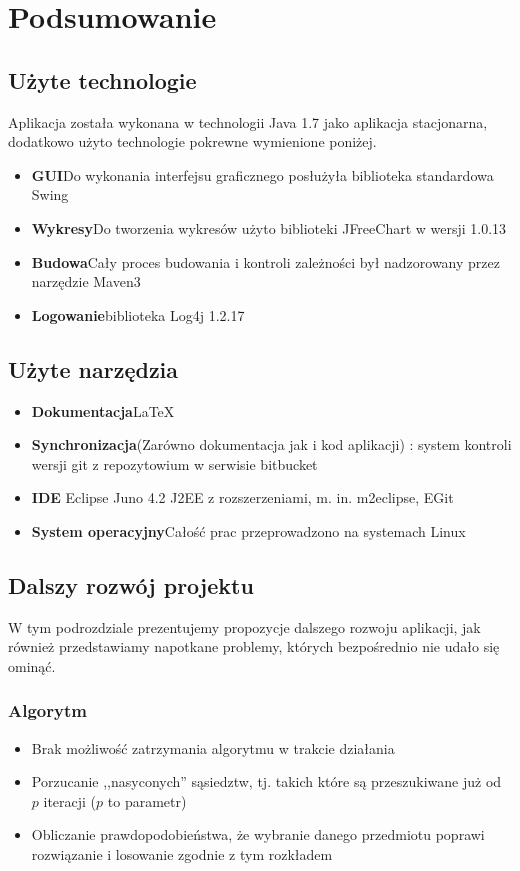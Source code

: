 \documentclass[a4paper,12pt,notitlepage]{mwrep}
\begin{document}
\chapter{Podsumowanie}
\section{Użyte technologie}
Aplikacja została wykonana w technologii Java 1.7
jako aplikacja stacjonarna,
dodatkowo użyto technologie pokrewne wymienione poniżej.
\begin{itemize}
	\item	\textbf{GUI}\quad Do wykonania interfejsu graficznego posłużyła biblioteka standardowa Swing
	\item	\textbf{Wykresy}\quad Do tworzenia wykresów użyto biblioteki JFreeChart w wersji 1.0.13
	\item	\textbf{Budowa}\quad Cały proces budowania i kontroli zależności był nadzorowany przez narzędzie
					Maven3
	\item	\textbf{Logowanie}\quad biblioteka Log4j 1.2.17
\end{itemize}

\section{Użyte narzędzia}
\begin{itemize}
	\item	\textbf{Dokumentacja}\quad \LaTeX
	\item	\textbf{Synchronizacja}\quad (Zarówno dokumentacja jak i kod aplikacji) : system kontroli wersji git
			z repozytowium w serwisie bitbucket
	\item	\textbf{IDE\quad} Eclipse Juno 4.2 J2EE z rozszerzeniami, m. in. m2eclipse, EGit
	\item	\textbf{System operacyjny}\quad Całość prac przeprowadzono na systemach Linux
\end{itemize}

\section{Dalszy rozwój projektu}
W tym podrozdziale prezentujemy propozycje dalszego rozwoju aplikacji, jak również przedstawiamy napotkane problemy, których
bezpośrednio nie udało się ominąć.
\subsection{Algorytm}
\begin{itemize}
	\item	Brak możliwość zatrzymania algorytmu w trakcie działania
	\item	Porzucanie ,,nasyconych'' sąsiedztw, tj. takich które są przeszukiwane już od $p$ iteracji ($p$ to parametr)
	\item	Obliczanie prawdopodobieństwa, że wybranie danego przedmiotu poprawi rozwiązanie i losowanie
		zgodnie z tym rozkładem
\end{itemize}
\end{document}
